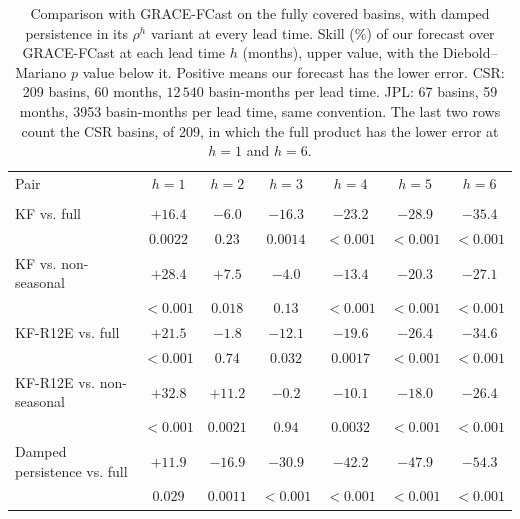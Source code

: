 \documentclass[hess, manuscript]{copernicus}
\begin{document}
\begin{table}[!htbp]
\caption{Comparison with GRACE-FCast on the fully covered basins, with
damped persistence in its $\rho^{h}$ variant at every lead time. Skill
(\%) of our forecast over GRACE-FCast at each lead time $h$ (months),
upper value, with the Diebold--Mariano $p$ value below it. Positive means
our forecast has the lower error. CSR:
209 basins, 60 months, $12\,540$ basin-months per lead time. JPL: 67
basins, 59 months, 3953 basin-months per lead time, same convention.
The last two rows count the CSR basins, of 209, in which the full product
has the lower error at $h = 1$ and $h = 6$.}
\label{tab:li}
\begin{tabular}{lcccccc}
\tophline
Pair & $h{=}1$ & $h{=}2$ & $h{=}3$ & $h{=}4$ & $h{=}5$ & $h{=}6$ \\
\middlehline
\multicolumn{7}{l}{\textit{CSR}} \\
KF vs. full & $+16.4$ & $-6.0$ & $-16.3$ & $-23.2$ & $-28.9$ & $-35.4$ \\
 & $0.0022$ & $0.23$ & $0.0014$ & $<0.001$ & $<0.001$ & $<0.001$ \\
KF vs. non-seasonal & $+28.4$ & $+7.5$ & $-4.0$ & $-13.4$ & $-20.3$ & $-27.1$ \\
 & $<0.001$ & $0.018$ & $0.13$ & $<0.001$ & $<0.001$ & $<0.001$ \\
KF-R12E vs. full & $+21.5$ & $-1.8$ & $-12.1$ & $-19.6$ & $-26.4$ & $-34.6$ \\
 & $<0.001$ & $0.74$ & $0.032$ & $0.0017$ & $<0.001$ & $<0.001$ \\
KF-R12E vs. non-seasonal & $+32.8$ & $+11.2$ & $-0.2$ & $-10.1$ & $-18.0$ & $-26.4$ \\
 & $<0.001$ & $0.0021$ & $0.94$ & $0.0032$ & $<0.001$ & $<0.001$ \\
Damped persistence vs. full & $+11.9$ & $-16.9$ & $-30.9$ & $-42.2$ & $-47.9$ & $-54.3$ \\
 & $0.029$ & $0.0011$ & $<0.001$ & $<0.001$ & $<0.001$ & $<0.001$ \\

\end{tabular}
\end{table}
\end{document}
